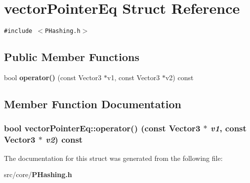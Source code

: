 \section{vector\-Pointer\-Eq Struct Reference}
\label{structvectorPointerEq}
{\tt \#include $<$PHashing.h$>$}

\subsection*{Public Member Functions}
\begin{CompactItemize}
\item 
bool {\bf operator()} (const Vector3 $\ast$v1, const Vector3 $\ast$v2) const
\end{CompactItemize}


\subsection{Member Function Documentation}
\subsubsection{\setlength{\rightskip}{0pt plus 5cm}bool vector\-Pointer\-Eq::operator() (const Vector3 $\ast$ {\em v1}, const Vector3 $\ast$ {\em v2}) const\hspace{0.3cm}{\tt  [inline]}}\label{structvectorPointerEq_7331a93f39f9454b34f483f784ff3ce7}




The documentation for this struct was generated from the following file:\begin{CompactItemize}
\item 
src/core/{\bf PHashing.h}\end{CompactItemize}
